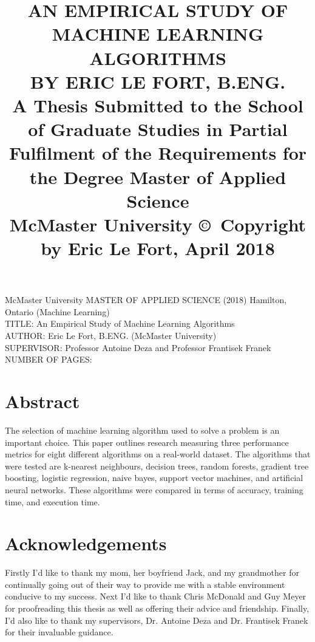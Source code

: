 \documentclass[titlepage]{article}
\title{
	AN EMPIRICAL STUDY OF MACHINE LEARNING ALGORITHMS\\[20mm]
	BY ERIC LE FORT, B.ENG.\\[20mm]
	\large A Thesis Submitted to the School of Graduate Studies in Partial Fulfilment of the Requirements for the Degree Master of Applied Science\\[20mm]
	McMaster University \copyright~Copyright by Eric Le Fort, April 2018
}\date{}
\begin{document}
\maketitle\normalsize\setcounter{page}{2}
\noindent McMaster University MASTER OF APPLIED SCIENCE (2018) Hamilton, Ontario (Machine Learning)\\[10mm]
TITLE: An Empirical Study of Machine Learning Algorithms\\
AUTHOR: Eric Le Fort, B.ENG. (McMaster University)\\
SUPERVISOR: Professor Antoine Deza and Professor Frantisek Franek\\
NUMBER OF PAGES: \pageref{LastPage}



\newpage
\section{Abstract}
The selection of machine learning algorithm used to solve a problem is an important choice. This paper outlines research measuring three performance metrics for eight different algorithms on a real-world dataset. The algorithms that were tested are k-nearest neighbours, decision trees, random forests, gradient tree boosting, logistic regression, naive bayes, support vector machines, and artificial neural networks. These algorithms were compared in terms of accuracy, training time, and execution time.



\newpage
\section{Acknowledgements}
Firstly I'd like to thank my mom, her boyfriend Jack, and my grandmother for continually going out of their way to provide me with a stable environment conducive to my success. Next I'd like to thank Chris McDonald and Guy Meyer for proofreading this thesis as well as offering their advice and friendship. Finally, I'd also like to thank my supervisors, Dr. Antoine Deza and Dr. Frantisek Franek for their invaluable guidance.



\newpage
\tableofcontents
\listoftables
\listoffigures



\newpage
{}
\end{document}
